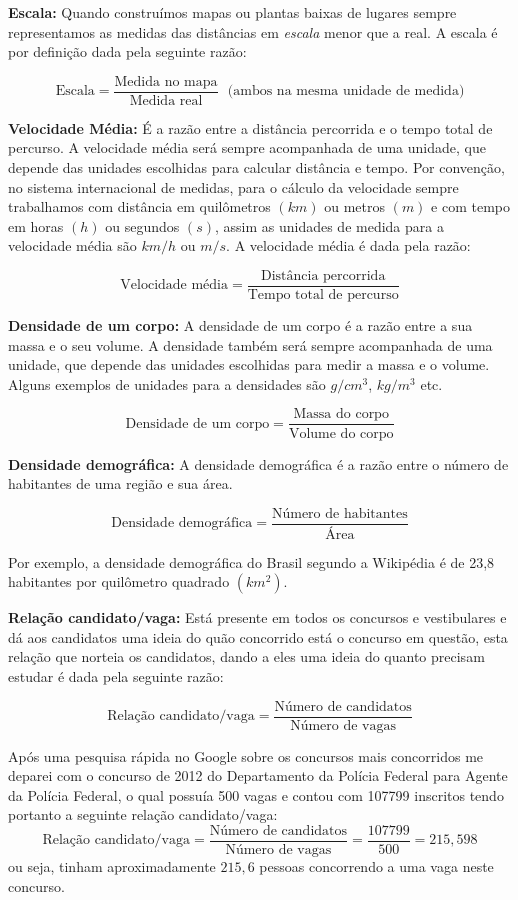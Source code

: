 \textbf{Escala:} Quando construímos mapas ou plantas baixas de lugares sempre representamos as medidas das distâncias em \textit{escala} menor que a real. A escala é por definição dada pela seguinte razão:

\[\text{Escala}= \frac{\text{Medida no mapa}}{\text{Medida real}} \ \ \ \text{(ambos na mesma unidade de medida)}\]

\textbf{Velocidade Média:} É a razão entre a distância percorrida e o tempo total de percurso. A velocidade média será sempre acompanhada de uma unidade, que depende das unidades escolhidas para calcular distância e tempo. Por convenção, no sistema internacional de medidas, para o cálculo da velocidade sempre trabalhamos com distância em quilômetros $(km)$ ou metros $(m)$ e com tempo em horas $(h)$ ou segundos $(s)$, assim as unidades de medida para a velocidade média são $km/h$ ou $m/s$. A velocidade média é dada pela razão:

\[\text{Velocidade média}= \frac{\text{Distância percorrida}}{\text{Tempo total de percurso}}\]

\textbf{Densidade de um corpo:} A densidade de um corpo é a razão entre a sua massa e o seu volume. A densidade também será sempre acompanhada de uma unidade, que depende das unidades escolhidas para medir a massa e o volume. Alguns exemplos de unidades para a densidades são $g/cm^3$, $kg/m^3$ etc.

\[\text{Densidade de um corpo}= \frac{\text{Massa do corpo}}{\text{Volume do corpo}}\]

\textbf{Densidade demográfica:} A densidade demográfica é a razão entre o número de habitantes de uma região e sua área.

\[\text{Densidade demográfica}= \frac{\text{Número de habitantes}}{\text{Área}}\]

Por exemplo, a densidade demográfica do Brasil segundo a Wikipédia é de 23,8 habitantes por quilômetro quadrado $(km^2)$.

\textbf{Relação candidato/vaga:} Está presente em todos os concursos e vestibulares e dá aos candidatos uma ideia do quão concorrido está o concurso em questão, esta relação que norteia os candidatos, dando a eles uma ideia do quanto precisam estudar é dada pela seguinte razão:

\[\text{Relação candidato/vaga}= \frac{\text{Número de candidatos}}{\text{Número de vagas}}\]

\begin{exem}
 Após uma pesquisa rápida no Google sobre os concursos mais concorridos me deparei com o concurso de 2012 do Departamento da Polícia Federal para Agente da Polícia Federal, o qual possuía 500 vagas e contou com 107799 inscritos tendo portanto a seguinte relação candidato/vaga:
 \[\text{Relação candidato/vaga}= \frac{\text{Número de candidatos}}{\text{Número de vagas}}= \frac{107799}{500}= 215,598\]
 ou seja, tinham aproximadamente $215,6$ pessoas concorrendo a uma vaga neste concurso.

 \fim
\end{exem}



